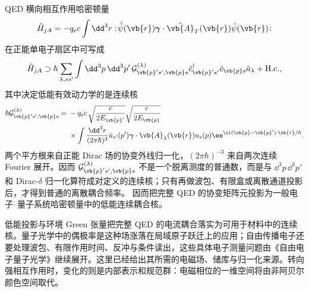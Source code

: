 QED 横向相互作用哈密顿量
\[
 \hat H_{jA}
 =-q_{\mathrm e} c\int\dd^3 r:\!\hat{\bar\psi}(\vb{r})
 \boldsymbol\gamma\cdot\hat{\vb{A}}_T(\vb{r})
 \hat\psi(\vb{r})\!:
\]
在正能单电子扇区中可写成
\[
 \hat H_{jA}
 \supset
 \hbar\sum_{\lambda,ss'}\int\dd^3 p\,\dd^3 p'\,
 \mathcal G^{(\lambda)}_{\vb{p}'s',\vb{p}s}
 \hat c_{\vb{p}'s'}^\dagger\hat c_{\vb{p}s}\hat a_\lambda
 +\mathrm{H.c.},
\]
其中决定低能有效动力学的是连续核
\begin{equation}
 {
 \begin{aligned}
 \hbar\mathcal G^{(\lambda)}_{\vb{p}'s',\vb{p}s}
 ={}&-q_{\mathrm e} c\,
 \sqrt{\frac{c}{2E_{\vb{p}'}}}
 \sqrt{\frac{c}{2E_{\vb{p}}}}\\
 &\times\int\frac{\dd^3 r}{(2\pi\hbar)^3}
 \bar u_{s'}(p')
 \boldsymbol\gamma\cdot\vb{A}_\lambda(\vb{r})
 u_s(p)
 \ee^{\ii(\vb{p}-\vb{p}')\cdot\vb{r}/\hbar}.
 \end{aligned}}
 \label{eq:qed_to_mode_matrix_element_detailed}
\end{equation}
两个平方根来自正能 Dirac 场的协变外线归一化，$(2\pi\hbar)^{-3}$ 来自两次连续 Fourier 展开。因而 $\mathcal G^{(\lambda)}_{\vb{p}'s',\vb{p}s}$ 不是一个脱离测度的普通数，而是与 $\dd^3 p\,\dd^3 p'$ 和 Dirac-$\delta$ 归一化算符成对定义的连续核；只有再做波包、有限盒或离散通道投影后，才得到普通的离散耦合频率。 因而把完整 QED 的协变矩阵元投影为一般电子--量子系统哈密顿量中的低能连续耦合核。

低能投影与环境 Green 张量把完整 QED 的电流耦合落实为可用于材料中的连续核。量子光学中的偶极率是这种场涨落在局域原子跃迁上的应用；自由传播电子还要处理波包、有限作用时间、反冲与条件读出，这些具体电子测量问题由《自由电子量子光学》继续展开。这里已经给出其所需的电磁场、储库与归一化来源。转向强相互作用时，变化的则是内部表示和规范群：电磁相位的一维空间将由非阿贝尔颜色空间取代。




